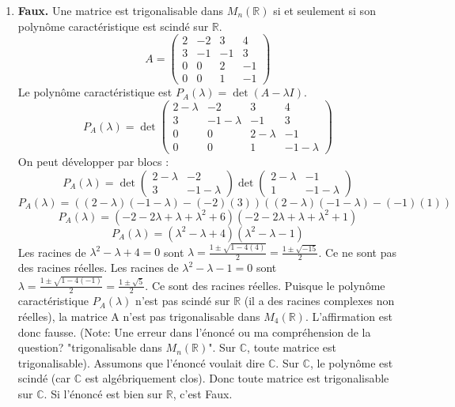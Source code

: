\begin{solution}
\begin{enumerate}
    \item \textbf{Faux.} Une matrice est trigonalisable dans $M_n(\mathbb{R})$ si et seulement si son polynôme caractéristique est scindé sur $\mathbb{R}$.
    \[ A = \begin{pmatrix} 2 & -2 & 3 & 4 \\ 3 & -1 & -1 & 3 \\ 0 & 0 & 2 & -1 \\ 0 & 0 & 1 & -1 \end{pmatrix} \]
    Le polynôme caractéristique est $P_A(\lambda) = \det(A-\lambda I)$.
    \[ P_A(\lambda) = \det \begin{pmatrix} 2-\lambda & -2 & 3 & 4 \\ 3 & -1-\lambda & -1 & 3 \\ 0 & 0 & 2-\lambda & -1 \\ 0 & 0 & 1 & -1-\lambda \end{pmatrix} \]
    On peut développer par blocs :
    \[ P_A(\lambda) = \det \begin{pmatrix} 2-\lambda & -2 \\ 3 & -1-\lambda \end{pmatrix} \det \begin{pmatrix} 2-\lambda & -1 \\ 1 & -1-\lambda \end{pmatrix} \]
    \[ P_A(\lambda) = ((2-\lambda)(-1-\lambda) - (-2)(3)) ((2-\lambda)(-1-\lambda) - (-1)(1)) \]
    \[ P_A(\lambda) = (-2 - 2\lambda + \lambda + \lambda^2 + 6) (-2 - 2\lambda + \lambda + \lambda^2 + 1) \]
    \[ P_A(\lambda) = (\lambda^2 - \lambda + 4) (\lambda^2 - \lambda - 1) \]
    Les racines de $\lambda^2 - \lambda + 4 = 0$ sont $\lambda = \frac{1 \pm \sqrt{1 - 4(4)}}{2} = \frac{1 \pm \sqrt{-15}}{2}$. Ce ne sont pas des racines réelles.
    Les racines de $\lambda^2 - \lambda - 1 = 0$ sont $\lambda = \frac{1 \pm \sqrt{1 - 4(-1)}}{2} = \frac{1 \pm \sqrt{5}}{2}$. Ce sont des racines réelles.
    Puisque le polynôme caractéristique $P_A(\lambda)$ n'est pas scindé sur $\mathbb{R}$ (il a des racines complexes non réelles), la matrice A n'est pas trigonalisable dans $M_4(\mathbb{R})$.
    L'affirmation est donc fausse. (Note: Une erreur dans l'énoncé ou ma compréhension de la question? "trigonalisable dans $M_n(\mathbb{R})$". Sur $\mathbb{C}$, toute matrice est trigonalisable). Assumons que l'énoncé voulait dire $\mathbb{C}$. Sur $\mathbb{C}$, le polynôme est scindé (car $\mathbb{C}$ est algébriquement clos). Donc toute matrice est trigonalisable sur $\mathbb{C}$. Si l'énoncé est bien sur $\mathbb{R}$, c'est Faux.


\end{enumerate}
\end{solution}
